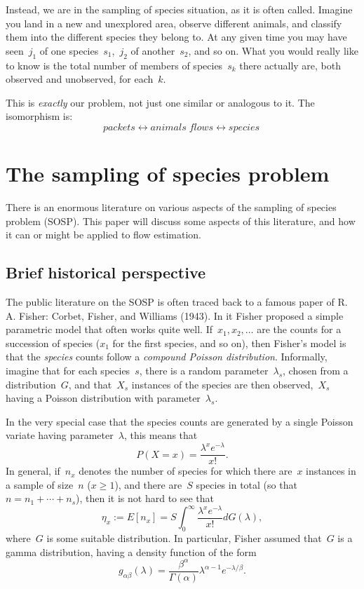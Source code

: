 \documentclass{paper}
\begin{document}
Instead, we are in the sampling of species situation, as it is often called.
Imagine you land in a new and unexplored area, observe different animals, and
classify them into the different species they belong to. At any given time you
may have seen~$j_1$ of one species~$s_1$,~$j_2$ of another~$s_2$, and so on.
What you would really like to know is the total number of members of
species~$s_k$ there actually are, both observed and unobserved, for each~$k$.

This is \emph{exactly} our problem, not just one similar or analogous to it.
The isomorphism is:
$$ packets \longleftrightarrow animals \; flows \longleftrightarrow species~$$

\section{The sampling of species problem}

There is an enormous literature on various aspects of the sampling of species
problem (SOSP). This paper will discuss some aspects of this literature, and how
it can or might be applied to flow estimation.

\subsection{Brief historical perspective}

The public literature on the SOSP is often traced back to a famous paper of R.
A. Fisher: Corbet, Fisher, and Williams (1943). In it Fisher proposed a simple
parametric model that often works quite well. If~$x_1, x_2, \dots$ are the
counts for a succession of species ($x_1$ for the first species, and so on),
then Fisher's model is that the \emph{species} counts follow a \emph{compound
Poisson distribution}. Informally, imagine that for each species~$s$, there is a
random parameter~$\lambda_s$, chosen from a distribution~$G$, and that~$X_s$
instances of the species are then observed,~$X_s$ having a Poisson distribution
with parameter~$\lambda_s$.

In the very special case that the species counts are generated by a single
Poisson variate having parameter~$\lambda$, this means that
$$ P(X = x) = \frac{\lambda^x e^{-\lambda}}{x!}. $$
In general, if~$n_x$ denotes the number of species for which there are~$x$
instances in a sample of size~$n$ ($x \geq 1$), and there are~$S$ species in
total (so that~$n = n_1 + \cdots + n_s$), then it is not hard to see that
$$ \eta_x := E[n_x] = S \int_0^\infty \frac{\lambda^x e^{-\lambda}}{x!} dG(\lambda), $$
where~$G$ is some suitable distribution. In particular, Fisher assumed that~$G$
is a gamma distribution, having a density function of the form
$$ g_{\alpha\beta}(\lambda) = \frac{\beta^\alpha}{\Gamma(\alpha)} \lambda^{\alpha-1}e^{-\lambda/\beta}. $$
\end{document}
